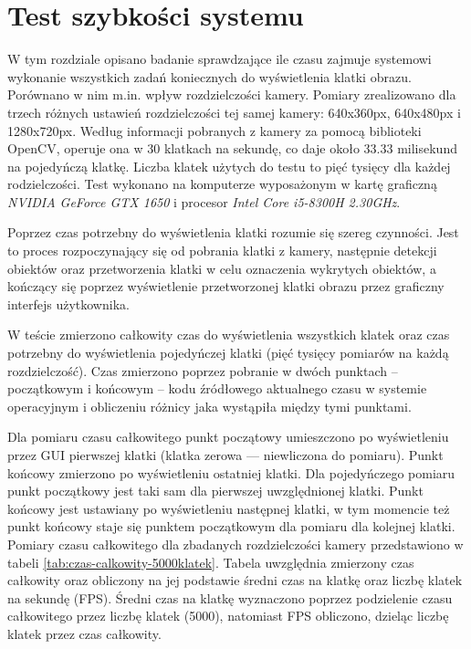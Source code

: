 \chapter{Test szybkości systemu}
\label{chap:test-szybkosci}
W tym rozdziale opisano badanie sprawdzające ile czasu zajmuje systemowi wykonanie wszystkich zadań koniecznych do wyświetlenia klatki obrazu. Porównano w nim m.in. wpływ rozdzielczości kamery. Pomiary zrealizowano dla trzech różnych ustawień rozdzielczości tej samej kamery: 640x360px, 640x480px i 1280x720px.
Według informacji pobranych z kamery za pomocą biblioteki OpenCV, operuje ona w 30 klatkach na sekundę, co daje około 33.33 milisekund na pojedyńczą klatkę. Liczba klatek użytych do testu to pięć tysięcy dla każdej rodzielczości.
Test wykonano na komputerze wyposażonym w kartę graficzną \emph{NVIDIA GeForce GTX 1650} i procesor \emph{Intel Core i5-8300H 2.30GHz}.

Poprzez czas potrzebny do wyświetlenia klatki rozumie się szereg czynności. Jest to proces rozpoczynający się od pobrania klatki z kamery, następnie detekcji obiektów oraz przetworzenia klatki w celu oznaczenia wykrytych obiektów, a kończący się poprzez wyświetlenie przetworzonej klatki obrazu przez graficzny interfejs użytkownika. 

W teście zmierzono całkowity czas do wyświetlenia wszystkich klatek oraz czas potrzebny do wyświetlenia pojedyńczej klatki (pięć tysięcy pomiarów na każdą rozdzielczość). Czas zmierzono poprzez pobranie w dwóch punktach -- początkowym i końcowym -- kodu źródłowego aktualnego czasu w systemie operacyjnym i obliczeniu różnicy jaka wystąpiła między tymi punktami. 

Dla pomiaru czasu całkowitego punkt początowy umieszczono po wyświetleniu przez GUI pierwszej klatki (klatka zerowa --- niewliczona do pomiaru). Punkt końcowy zmierzono po wyświetleniu ostatniej klatki.
Dla pojedyńczego pomiaru punkt początkowy jest taki sam dla pierwszej uwzględnionej klatki. Punkt końcowy jest ustawiany po wyświetleniu następnej klatki, w tym momencie też punkt końcowy staje się punktem początkowym dla pomiaru dla kolejnej klatki.
Pomiary czasu całkowitego dla zbadanych rozdzielczości kamery przedstawiono w tabeli \ref{tab:czas-calkowity-5000klatek}. Tabela uwzględnia zmierzony czas całkowity oraz obliczony na jej podstawie średni czas na klatkę oraz liczbę klatek na sekundę (FPS). Średni czas na klatkę wyznaczono poprzez podzielenie czasu całkowitego przez liczbę klatek (5000), natomiast FPS obliczono, dzieląc liczbę klatek przez czas całkowity.  


